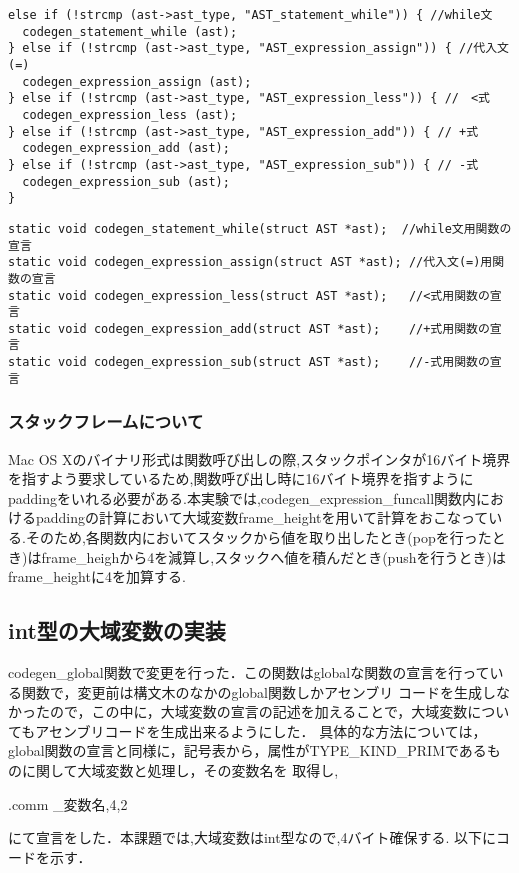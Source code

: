 \documentclass[10pt]{jsarticle}
\begin{document}
\begin{lstlisting}[caption=visit\_AST関数内,label=visit_AST]
else if (!strcmp (ast->ast_type, "AST_statement_while")) { //while文
  codegen_statement_while (ast);
} else if (!strcmp (ast->ast_type, "AST_expression_assign")) { //代入文(=)
  codegen_expression_assign (ast);
} else if (!strcmp (ast->ast_type, "AST_expression_less")) { //　<式
  codegen_expression_less (ast);
} else if (!strcmp (ast->ast_type, "AST_expression_add")) { // +式
  codegen_expression_add (ast);
} else if (!strcmp (ast->ast_type, "AST_expression_sub")) { // -式
  codegen_expression_sub (ast);
}
\end{lstlisting}

\begin{lstlisting}[caption=関数の宣言,label=関数の宣言]
static void codegen_statement_while(struct AST *ast);  //while文用関数の宣言
static void codegen_expression_assign(struct AST *ast); //代入文(=)用関数の宣言
static void codegen_expression_less(struct AST *ast);   //<式用関数の宣言
static void codegen_expression_add(struct AST *ast);    //+式用関数の宣言
static void codegen_expression_sub(struct AST *ast);    //-式用関数の宣言
\end{lstlisting}


\subsubsection{スタックフレームについて}
Mac OS Xのバイナリ形式は関数呼び出しの際,スタックポインタが16バイト境界を指すよう要求しているため,関数呼び出し時に16バイト境界を指すようにpaddingをいれる必要がある.本実験では,codegen\_expression\_funcall関数内におけるpaddingの計算において大域変数frame\_heightを用いて計算をおこなっている.そのため,各関数内においてスタックから値を取り出したとき(popを行ったとき)はframe\_heighから4を減算し,スタックへ値を積んだとき(pushを行うとき)はframe\_heightに4を加算する.

\subsection{int型の大域変数の実装}
codegen\_global関数で変更を行った．この関数はglobalな関数の宣言を行っている関数で，変更前は構文木のなかのglobal関数しかアセンブリ
コードを生成しなかったので，この中に，大域変数の宣言の記述を加えることで，大域変数についてもアセンブリコードを生成出来るようにした．
具体的な方法については，global関数の宣言と同様に，記号表から，属性がTYPE\_KIND\_PRIMであるものに関して大域変数と処理し，その変数名を
取得し,
\begin{center}
.comm \_変数名,4,2
\end{center}
にて宣言をした．本課題では,大域変数はint型なので,4バイト確保する.
以下にコードを示す．
\end{document}
